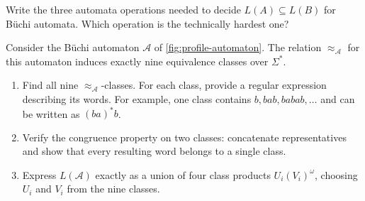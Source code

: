 \begin{chapex}
Write the three automata operations needed to decide
$L(A)\subseteq L(B)$ for B\"uchi automata.  Which operation is the
technically hardest one?
\end{chapex}

\begin{chapex}
Consider the B\"uchi automaton $\mathcal A$ of \cref{fig:profile-automaton}.
The relation $\approx_{\mathcal A}$ for this automaton induces
exactly nine equivalence classes over $\Sigma^*$.
\begin{enumerate}
  \item Find all nine $\approx_{\mathcal A}$-classes.  For each class, provide a
        regular expression describing its words.  For example, one class
        contains $b,bab,babab,\ldots$ and can be written as $(ba)^*b$.
  \item Verify the congruence property on two classes: concatenate
        representatives and show that every resulting word belongs to a
        single class.
  \item Express $L(\mathcal A)$ exactly as a union of four class products
        $U_i(V_i)^\omega$, choosing $U_i$ and $V_i$ from the nine
        classes.
\end{enumerate}
\end{chapex}
